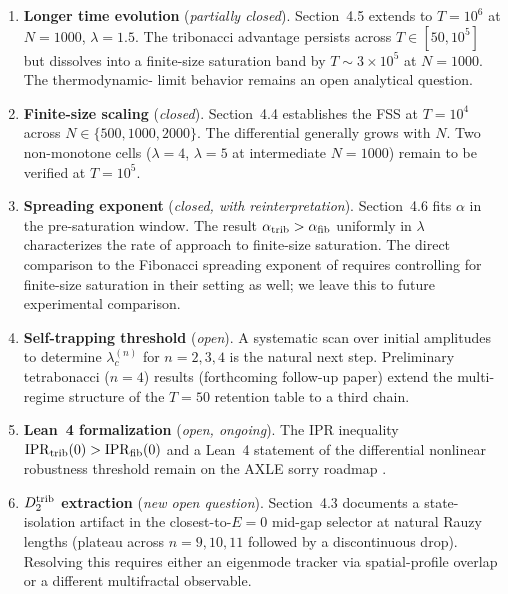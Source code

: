 \documentclass[12pt,a4paper]{article}
\begin{document}
\begin{enumerate}

\item \textbf{Longer time evolution} (\emph{partially closed}). Section~4.5
extends to $T=10^6$ at $N=1000$, $\lambda=1.5$. The tribonacci advantage
persists across $T \in [50, 10^5]$ but dissolves into a finite-size
saturation band by $T \sim 3\times10^5$ at $N=1000$. The thermodynamic-
limit behavior remains an open analytical question.

\item \textbf{Finite-size scaling} (\emph{closed}). Section~4.4 establishes
the FSS at $T=10^4$ across $N \in \{500, 1000, 2000\}$. The differential
generally grows with $N$. Two non-monotone cells ($\lambda=4$, $\lambda=5$
at intermediate $N=1000$) remain to be verified at $T=10^5$.

\item \textbf{Spreading exponent} (\emph{closed, with reinterpretation}).
Section~4.6 fits $\alpha$ in the pre-saturation window. The result
$\alpha_{\rm trib} > \alpha_{\rm fib}$ uniformly in $\lambda$ characterizes
the rate of approach to finite-size saturation. The direct comparison to
the Fibonacci spreading exponent of \cite{Lahini2009} requires controlling
for finite-size saturation in their setting as well; we leave this to
future experimental comparison.

\item \textbf{Self-trapping threshold} (\emph{open}). A systematic scan
over initial amplitudes to determine $\lambda_c^{(n)}$ for $n=2,3,4$ is
the natural next step. Preliminary tetrabonacci ($n=4$) results
(forthcoming follow-up paper) extend the multi-regime structure of the
$T=50$ retention table to a third chain.

\item \textbf{Lean~4 formalization} (\emph{open, ongoing}). The IPR
inequality $\mathrm{IPR}_{\rm trib}(0) > \mathrm{IPR}_{\rm fib}(0)$ and a
Lean~4 statement of the differential nonlinear robustness threshold remain
on the AXLE sorry roadmap \cite{AXLE2026}.

\item \textbf{$D_2^{\rm trib}$ extraction} (\emph{new open question}).
Section~4.3 documents a state-isolation artifact in the closest-to-$E=0$
mid-gap selector at natural Rauzy lengths (plateau across $n=9,10,11$
followed by a discontinuous drop). Resolving this requires either an
eigenmode tracker via spatial-profile overlap or a different multifractal
observable.

\end{enumerate}
\end{document}
